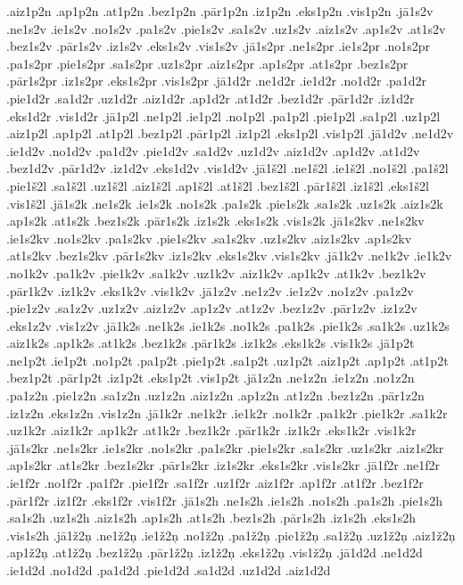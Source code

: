 {.aiz1p2n
.ap1p2n
.at1p2n
.bez1p2n
.pār1p2n
.iz1p2n
.eks1p2n
.vis1p2n
.jā1s2v
.ne1s2v
.ie1s2v
.no1s2v
.pa1s2v
.pie1s2v
.sa1s2v
.uz1s2v
.aiz1s2v
.ap1s2v
.at1s2v
.bez1s2v
.pār1s2v
.iz1s2v
.eks1s2v
.vis1s2v
.jā1s2pr
.ne1s2pr
.ie1s2pr
.no1s2pr
.pa1s2pr
.pie1s2pr
.sa1s2pr
.uz1s2pr
.aiz1s2pr
.ap1s2pr
.at1s2pr
.bez1s2pr
.pār1s2pr
.iz1s2pr
.eks1s2pr
.vis1s2pr
.jā1d2r
.ne1d2r
.ie1d2r
.no1d2r
.pa1d2r
.pie1d2r
.sa1d2r
.uz1d2r
.aiz1d2r
.ap1d2r
.at1d2r
.bez1d2r
.pār1d2r
.iz1d2r
.eks1d2r
.vis1d2r
.jā1p2l
.ne1p2l
.ie1p2l
.no1p2l
.pa1p2l
.pie1p2l
.sa1p2l
.uz1p2l
.aiz1p2l
.ap1p2l
.at1p2l
.bez1p2l
.pār1p2l
.iz1p2l
.eks1p2l
.vis1p2l
.jā1d2v
.ne1d2v
.ie1d2v
.no1d2v
.pa1d2v
.pie1d2v
.sa1d2v
.uz1d2v
.aiz1d2v
.ap1d2v
.at1d2v
.bez1d2v
.pār1d2v
.iz1d2v
.eks1d2v
.vis1d2v
.jā1š2l
.ne1š2l
.ie1š2l
.no1š2l
.pa1š2l
.pie1š2l
.sa1š2l
.uz1š2l
.aiz1š2l
.ap1š2l
.at1š2l
.bez1š2l
.pār1š2l
.iz1š2l
.eks1š2l
.vis1š2l
.jā1s2k
.ne1s2k
.ie1s2k
.no1s2k
.pa1s2k
.pie1s2k
.sa1s2k
.uz1s2k
.aiz1s2k
.ap1s2k
.at1s2k
.bez1s2k
.pār1s2k
.iz1s2k
.eks1s2k
.vis1s2k
.jā1s2kv
.ne1s2kv
.ie1s2kv
.no1s2kv
.pa1s2kv
.pie1s2kv
.sa1s2kv
.uz1s2kv
.aiz1s2kv
.ap1s2kv
.at1s2kv
.bez1s2kv
.pār1s2kv
.iz1s2kv
.eks1s2kv
.vis1s2kv
.jā1k2v
.ne1k2v
.ie1k2v
.no1k2v
.pa1k2v
.pie1k2v
.sa1k2v
.uz1k2v
.aiz1k2v
.ap1k2v
.at1k2v
.bez1k2v
.pār1k2v
.iz1k2v
.eks1k2v
.vis1k2v
.jā1z2v
.ne1z2v
.ie1z2v
.no1z2v
.pa1z2v
.pie1z2v
.sa1z2v
.uz1z2v
.aiz1z2v
.ap1z2v
.at1z2v
.bez1z2v
.pār1z2v
.iz1z2v
.eks1z2v
.vis1z2v
.jā1k2s
.ne1k2s
.ie1k2s
.no1k2s
.pa1k2s
.pie1k2s
.sa1k2s
.uz1k2s
.aiz1k2s
.ap1k2s
.at1k2s
.bez1k2s
.pār1k2s
.iz1k2s
.eks1k2s
.vis1k2s
.jā1p2t
.ne1p2t
.ie1p2t
.no1p2t
.pa1p2t
.pie1p2t
.sa1p2t
.uz1p2t
.aiz1p2t
.ap1p2t
.at1p2t
.bez1p2t
.pār1p2t
.iz1p2t
.eks1p2t
.vis1p2t
.jā1z2n
.ne1z2n
.ie1z2n
.no1z2n
.pa1z2n
.pie1z2n
.sa1z2n
.uz1z2n
.aiz1z2n
.ap1z2n
.at1z2n
.bez1z2n
.pār1z2n
.iz1z2n
.eks1z2n
.vis1z2n
.jā1k2r
.ne1k2r
.ie1k2r
.no1k2r
.pa1k2r
.pie1k2r
.sa1k2r
.uz1k2r
.aiz1k2r
.ap1k2r
.at1k2r
.bez1k2r
.pār1k2r
.iz1k2r
.eks1k2r
.vis1k2r
.jā1s2kr
.ne1s2kr
.ie1s2kr
.no1s2kr
.pa1s2kr
.pie1s2kr
.sa1s2kr
.uz1s2kr
.aiz1s2kr
.ap1s2kr
.at1s2kr
.bez1s2kr
.pār1s2kr
.iz1s2kr
.eks1s2kr
.vis1s2kr
.jā1f2r
.ne1f2r
.ie1f2r
.no1f2r
.pa1f2r
.pie1f2r
.sa1f2r
.uz1f2r
.aiz1f2r
.ap1f2r
.at1f2r
.bez1f2r
.pār1f2r
.iz1f2r
.eks1f2r
.vis1f2r
.jā1s2h
.ne1s2h
.ie1s2h
.no1s2h
.pa1s2h
.pie1s2h
.sa1s2h
.uz1s2h
.aiz1s2h
.ap1s2h
.at1s2h
.bez1s2h
.pār1s2h
.iz1s2h
.eks1s2h
.vis1s2h
.jā1ž2ņ
.ne1ž2ņ
.ie1ž2ņ
.no1ž2ņ
.pa1ž2ņ
.pie1ž2ņ
.sa1ž2ņ
.uz1ž2ņ
.aiz1ž2ņ
.ap1ž2ņ
.at1ž2ņ
.bez1ž2ņ
.pār1ž2ņ
.iz1ž2ņ
.eks1ž2ņ
.vis1ž2ņ
.jā1d2d
.ne1d2d
.ie1d2d
.no1d2d
.pa1d2d
.pie1d2d
.sa1d2d
.uz1d2d
.aiz1d2d
}
